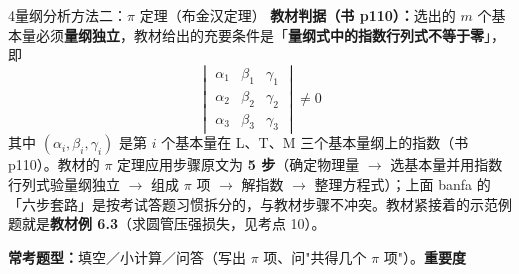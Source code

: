 \begin{kaodian}{4}{量纲分析方法二：$\pi$ 定理（布金汉定理）}
\textbf{教材判据（书 p110）：}选出的 $m$ 个基本量必须\textbf{量纲独立}，教材给出的充要条件是「\textbf{量纲式中的指数行列式不等于零}」，即
\[ \begin{vmatrix} \alpha_1 & \beta_1 & \gamma_1 \\ \alpha_2 & \beta_2 & \gamma_2 \\ \alpha_3 & \beta_3 & \gamma_3 \end{vmatrix}\neq 0 \]
其中 $(\alpha_i,\beta_i,\gamma_i)$ 是第 $i$ 个基本量在 L、T、M 三个基本量纲上的指数（书 p110）。教材的 $\pi$ 定理应用步骤原文为 \textbf{5 步}（确定物理量 $\to$ 选基本量并用指数行列式验量纲独立 $\to$ 组成 $\pi$ 项 $\to$ 解指数 $\to$ 整理方程式）；上面 banfa 的「六步套路」是按考试答题习惯拆分的，与教材步骤不冲突。教材紧接着的示范例题就是\textbf{教材例 6.3}（求圆管压强损失，见考点 10）。

\textbf{常考题型：}填空／小计算／问答（写出 $\pi$ 项、问"共得几个 $\pi$ 项"）。\quad\textbf{重要度 }\quad{}\quad{}
\end{kaodian}

